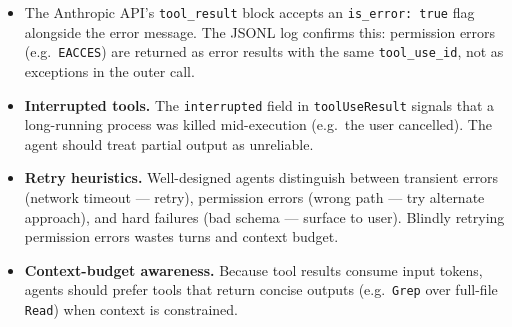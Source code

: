 \begin{itemize}
  \item The Anthropic API's \texttt{tool\_result} block accepts an \texttt{is\_error:
    true} flag alongside the error message. The JSONL log confirms this: permission
    errors (e.g.\ \texttt{EACCES}) are returned as error results with the same
    \texttt{tool\_use\_id}, not as exceptions in the outer call.

  \item \textbf{Interrupted tools.} The \texttt{interrupted} field in
    \texttt{toolUseResult} signals that a long-running process was killed mid-execution
    (e.g.\ the user cancelled). The agent should treat partial output as unreliable.

  \item \textbf{Retry heuristics.} Well-designed agents distinguish between transient
    errors (network timeout --- retry), permission errors (wrong path --- try alternate
    approach), and hard failures (bad schema --- surface to user). Blindly retrying
    permission errors wastes turns and context budget.

  \item \textbf{Context-budget awareness.} Because tool results consume input tokens,
    agents should prefer tools that return concise outputs (e.g.\ \texttt{Grep} over
    full-file \texttt{Read}) when context is constrained.
\end{itemize}

